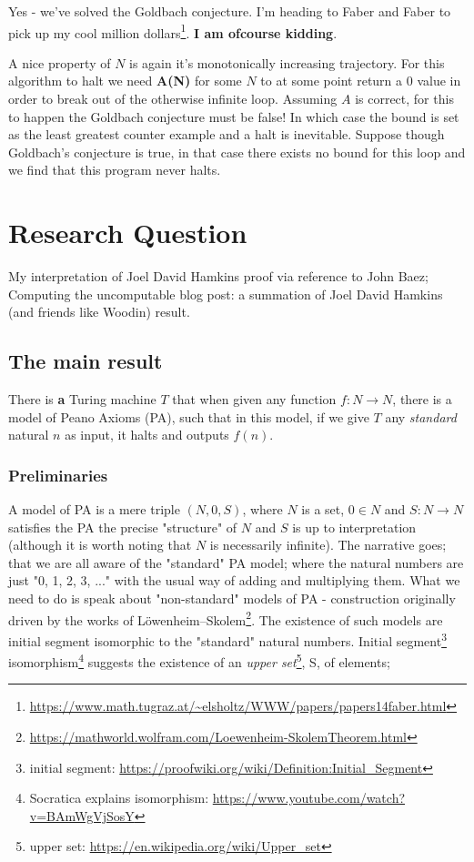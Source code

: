 \documentclass{article}
\begin{document}
Yes - we've solved the Goldbach conjecture. I'm heading to Faber and Faber to pick up my cool million dollars\footnote{\url{https://www.math.tugraz.at/~elsholtz/WWW/papers/papers14faber.html}}. \textbf{I am ofcourse kidding}. 

A nice property of $N$ is again it's monotonically increasing trajectory. For this algorithm to halt we need \textbf{A(N)} for some $N$ to at some point return a $0$ value in order to break out of the otherwise infinite loop. Assuming $A$ is correct, for this to happen the Goldbach conjecture must be false! In which case the bound is set as the least greatest counter example and a halt is inevitable. Suppose though Goldbach's conjecture is true, in that case there exists no bound for this loop and we find that this program never halts.

\pagebreak
\section{Research Question}
My interpretation of Joel David Hamkins proof via reference to John Baez; Computing the uncomputable blog post: a summation of Joel David Hamkins (and friends like Woodin) result.

\subsection{The main result}
There is \textbf{a} Turing machine $T$ that when given any function $f: N \rightarrow N$, there is a model of Peano Axioms (PA), such that in this model, if we give $T$ any \emph{standard} natural $n$ as input, it halts and outputs $f(n)$.

\subsubsection{Preliminaries}
A model of PA is a mere triple $(N, 0, S)$, where $N$ is a set, $0 \in N$ and $S: N \rightarrow N$ satisfies the PA the precise "structure" of $N$ and $S$ is up to interpretation (although it is worth noting that $N$ is necessarily infinite). The narrative goes; that we are all aware of the "standard" PA model; where the natural numbers are just "0, 1, 2, 3, ..." with the usual way of adding and multiplying them. What we need to do is speak about "non-standard" models of PA - construction originally driven by the works of Löwenheim–Skolem\footnote{\url{https://mathworld.wolfram.com/Loewenheim-SkolemTheorem.html}}. The existence of such models are initial segment isomorphic to the "standard" natural numbers. Initial segment\footnote{initial segment: \url{https://proofwiki.org/wiki/Definition:Initial_Segment}} isomorphism\footnote{Socratica explains isomorphism: \url{https://www.youtube.com/watch?v=BAmWgVjSosY}} suggests the existence of an \emph{upper set}\footnote{upper set: \url{https://en.wikipedia.org/wiki/Upper_set}}, S, of elements;
\end{document}
